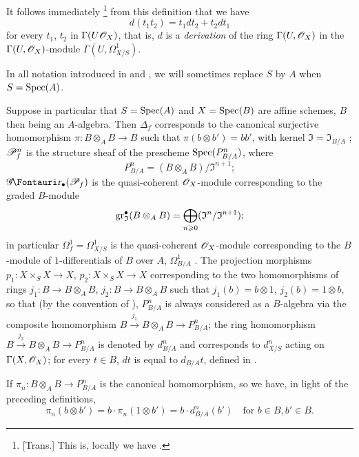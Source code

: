 It follows immediately
\footnote{
[Trans.] This is, locally we have .
}
from this definition that we have
\[
  \label{IV.16.3.6.1}
  d(t_1 t_2) = t_1 dt_2 + t_2 dt_1
  \tag{16.3.6.1} 
\]
for every $t_1$, $t_2$ in $\Gamma(U \mathscr{O}_X)$, that is, $d$ is a \emph{derivation} of the ring $\Gamma(U, \mathscr{O}_X)$ in the $\Gamma(U, \mathscr{O}_X)$-module $\Gamma(U, \Omega_{X/S}^1)$.

In all notation introduced in  and , we will sometimes replace $S$ by $A$ when $S = \operatorname{Spec}(A)$.

\begin{env}[16.3.7]
\label{IV.16.3.7}
Suppose in particular that $S = \operatorname{Spec}(A)$ and $X = \operatorname{Spec}(B)$ are affine schemes, $B$ then being an $A$-algebra.
Then $\Delta_f$ corresponds to the canonical surjective homomorphism $\pi: B \otimes_A B \to B$ such that $\pi(b\otimes b') = bb'$, with kernel $\mathfrak{I} = \mathfrak{I}_{B/A}$ ;
$\mathscr{P}_{f}^n$ is the structure sheaf of the prescheme $\operatorname{Spec}(P_{B/A}^n)$, where
\[
  P_{B/A}^n = (B \otimes_A B)/\mathfrak{I}^{n+1};
\]
$\shGr_\bullet(\sh{P}_f)$ is the quasi-coherent $\mathscr{O}_X$-module corresponding to the graded $B$-module
\[
  \operatorname{gr}_\mathfrak{I}^\bullet(B \otimes_A B) = \bigoplus_{n \geqslant 0} (\mathfrak{I}^n/\mathfrak{I}^{n+1});
\]
in particular $\Omega_f^1 = \Omega_{X/S}^1$ is the quasi-coherent $\mathscr{O}_X$-module corresponding to the $B$-module of $1$-differentials of $B$ over $A$, $\Omega_{B/A}^1$ .
The projection morphisms $p_1: X \times_S X \to X$, $p_2: X \times_S X \to X$ corresponding to the two homomorphisms of rings $j_1: B \to B \otimes_A B$, $j_2: B \to B \otimes_A B$ such that $j_1(b) = b \otimes 1$, $j_2(b) = 1 \otimes b$, so that (by the convention of ), $P_{B/A}^n$ is always considered as a $B$-algebra via the composite homomorphism $B \xrightarrow{j_1} B \otimes_A B \to P_{B/A}^n$;
the ring homomorphism $B \xrightarrow{j_2} B \otimes_A B \to P_{B/A}^n$ is denoted by $d_{B/A}^n$ and corresponds to $d_{X/S}^n$ acting on $\Gamma(X, \mathscr{O}_X)$;
for every $t \in B$, $dt$ is equal to $d_{B/A}t$, defined in .

If $\pi_n: B \otimes_A B \to P_{B/A}^n$ is the canonical homomorphism, so we have, in light of the preceding definitions,
\[
  \label{IV.16.3.7.1}
  \pi_n(b\otimes b') = b \cdot \pi_n(1\otimes b') = b \cdot d_{B/A}^n(b') \quad \text{for } b \in B, b' \in B.
  \tag{16.3.7.1}
\]
\end{env}

